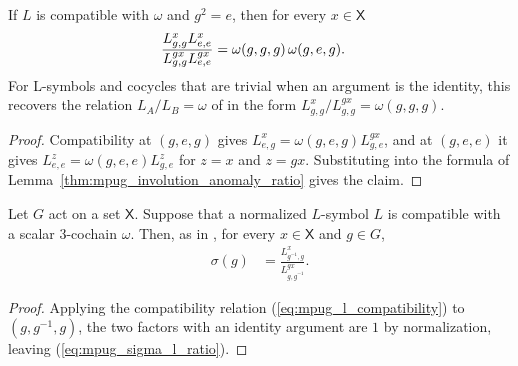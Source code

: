 \begin{lemma}
    \label{thm:mpug_involution_anomaly_identity_ratio}
    \leanok
    If $L$ is compatible with $\omega$ and $g^2=e$, then for every
    $x\in\mathsf X$
    \begin{align}
        \frac{L^x_{g,g}L^x_{e,e}}{L^{gx}_{g,g}L^{gx}_{e,e}}
         & =\omega(g,g,g)\,\omega(g,e,g).
        \notag
    \end{align}
    For L-symbols and cocycles that are trivial when an argument is the
    identity, this recovers the relation $L_A/L_B=\omega$ of
    \cite[Section~III.C]{GarreRubioSchuch2024DomainWall} in the form
    $L^x_{g,g}/L^{gx}_{g,g}=\omega(g,g,g)$.
\end{lemma}
\begin{proof}\leanok
    Compatibility at $(g,e,g)$ gives $L^x_{e,g}=\omega(g,e,g)L^{gx}_{g,e}$,
    and at $(g,e,e)$ it gives $L^z_{e,e}=\omega(g,e,e)L^z_{g,e}$ for $z=x$ and
    $z=gx$. Substituting into the formula of
    Lemma~\ref{thm:mpug_involution_anomaly_ratio} gives the claim.
\end{proof}

\begin{lemma}
    \label{thm:mpug_sigma_l_ratio}
    \leanok
    Let $G$ act on a set $\mathsf X$. Suppose that a normalized $L$-symbol
    $L$ is compatible with a scalar $3$-cochain $\omega$. Then, as in
    \cite[lines~5327--5329]{FrancoRubio2025MPUGauging}, for every
    $x\in\mathsf X$ and $g\in G$,
    \begin{align}
        \sigma(g)
         & =\frac{L^x_{g^{-1},g}}{L^{g x}_{g,g^{-1}}}.
        \label{eq:mpug_sigma_l_ratio}
    \end{align}
\end{lemma}
\begin{proof}\leanok
    Applying the compatibility relation
    (\ref{eq:mpug_l_compatibility}) to $(g,g^{-1},g)$, the two factors with an
    identity argument are $1$ by normalization, leaving
    (\ref{eq:mpug_sigma_l_ratio}).
\end{proof}

